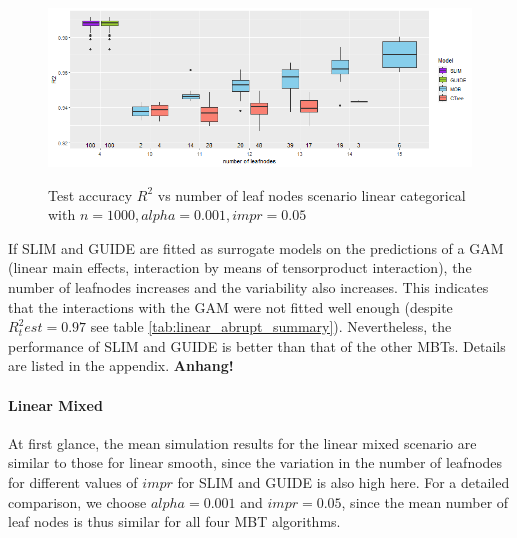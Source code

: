 \begin{figure} 
\caption{Test accuracy $R^2$ vs number of leaf nodes scenario linear categorical with $n=1000, alpha = 0.001, impr = 0.05$}
    \includegraphics[width=16cm]{Figures/simulations/batchtools/basic_scenarios/linear_abrupt/la_1000_standalone_r2_test.png}
    \label{fig:la_1000_standalone_r2_test}
\end{figure} 


If SLIM and GUIDE are fitted as surrogate models on the predictions of a GAM (linear main effects, interaction by means of tensorproduct interaction), the number of leafnodes increases and the variability also increases. This indicates that the interactions with the GAM were not fitted well enough (despite $R^2_test = 0.97$ see table \ref{tab:linear_abrupt_summary}).
Nevertheless, the performance of SLIM and GUIDE is better than that of the other MBTs. Details are listed in the appendix. \textbf{Anhang!}




\paragraph{Linear Mixed}
At first glance, the mean simulation results for the linear mixed scenario are similar to those for linear smooth, since the variation in the number of leafnodes for different values of $impr$ for SLIM and GUIDE is also high here. 
For a detailed comparison, we choose $alpha = 0.001$ and $impr = 0.05$, since the mean number of leaf nodes is thus similar for all four MBT algorithms.


